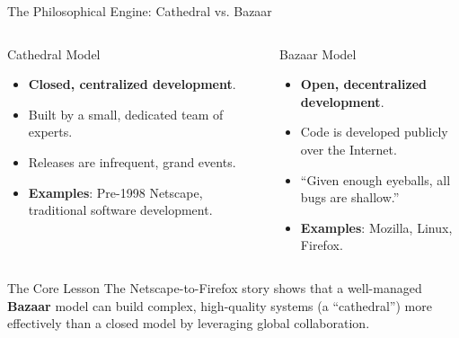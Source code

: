 \documentclass{beamer}
\begin{document}
\begin{frame}[t]{The Philosophical Engine: Cathedral vs. Bazaar}

\begin{columns}
    \begin{column}{0.48\textwidth}
        \begin{block}{Cathedral Model}
            \scriptsize
            \begin{itemize}
                \item \textbf{Closed, centralized development}.
                \item Built by a small, dedicated team of experts.
                \item Releases are infrequent, grand events.
                \item \textbf{Examples}: Pre-1998 Netscape, traditional software development.
            \end{itemize}
        \end{block}
    \end{column}
    \begin{column}{0.48\textwidth}
        \begin{block}{Bazaar Model}
            \scriptsize
            \begin{itemize}
                \item \textbf{Open, decentralized development}.
                \item Code is developed publicly over the Internet.
                \item ``Given enough eyeballs, all bugs are shallow.''
                \item \textbf{Examples}: Mozilla, Linux, Firefox.
            \end{itemize}
        \end{block}
    \end{column}
\end{columns}

\vspace{1em}

\begin{exampleblock}{The Core Lesson}
The Netscape-to-Firefox story shows that a well-managed \textbf{Bazaar} model can build complex, high-quality systems (a ``cathedral'') more effectively than a closed model by leveraging global collaboration.
\end{exampleblock}

\end{frame}
\end{document}
